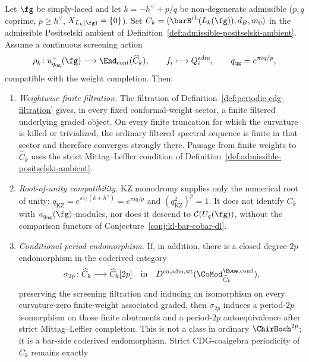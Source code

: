 \begin{theorem}
\label{thm:periodic-cdg-is-koszul-compatible}
%
Let $\fg$ be simply-laced and let $k=-h^\vee+p/q$ be
non-degenerate admissible \textup{(}$p,q$ coprime,
$p\geq h^\vee$, $X_{L_k(\fg)}=\{0\}$\textup{)}.  Set
$C_k=(\barB^{\mathrm{ch}}(L_k(\fg)),d_B,m_0)$ in the admissible
Positselski ambient of
Definition~\ref{def:admissible-positselski-ambient}.  Assume a
continuous screening action
\[
\rho_k\colon u_{q_{\mathrm{qg}}}^-(\fg)
\longrightarrow
\End_{\mathrm{cont}}(\widehat C_k),
\qquad
f_i\longmapsto Q_i^{\mathrm{adm}},
\qquad
q_{\mathrm{qg}}=e^{\pi i q/p},
\]
compatible with the weight completion.  Then:
\begin{enumerate}[label=\textup{(\roman*)}]
\item \emph{Weightwise finite filtration.}  The filtration
 of Definition~\ref{def:periodic-cdg-filtration} gives, in every
 fixed conformal-weight sector, a finite filtered underlying
 graded object.  On every finite truncation for which the curvature
 is killed or trivialized, the ordinary filtered spectral sequence is
 finite in that sector and therefore converges strongly there.
 Passage from finite weights to $\widehat C_k$ uses the strict
 Mittag--Leffler condition of
 Definition~\ref{def:admissible-positselski-ambient}.
\item \emph{Root-of-unity compatibility.}  KZ monodromy supplies only
 the numerical root of unity:
 $q_{\mathrm{KZ}}=e^{\pi i/(k+h^\vee)}=e^{\pi i q/p}$ and
 $(q_{\mathrm{KZ}}^2)^p=1$.  It does not identify $C_k$ with
 $u_{q_{\mathrm{qg}}}(\fg)$-modules, nor does it descend to
 $\mathcal C(U_q(\fg))$, without the comparison functors of
 Conjecture~\ref{conj:kl-bar-cobar-dl}.
\item \emph{Conditional period endomorphism.}  If, in addition, there
 is a closed degree-$2p$ endomorphism in the coderived category
 \[
 \sigma_{2p}\colon \widehat C_k \longrightarrow \widehat C_k[2p]
 \quad\text{in}\quad
 D^{\mathrm{co},\mathrm{adm,wt}}
 (\CoMod^{\Eone,\mathrm{conil}}_{\widehat C_k}),
 \]
 preserving the screening filtration and inducing an isomorphism on
 every curvature-zero finite-weight associated graded, then
 $\sigma_{2p}$ induces a period-$2p$ isomorphism on those finite
 abutments and a period-$2p$ autoequivalence after strict
 Mittag--Leffler completion.  This is not a class in ordinary
 $\ChirHoch^{2p}$; it is a bar-side coderived endomorphism.
 Strict CDG-coalgebra periodicity of $C_k$ remains exactly

\end{enumerate}
\end{theorem}
